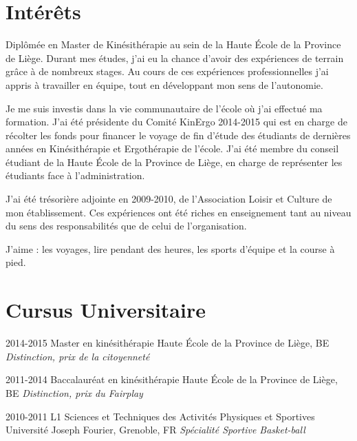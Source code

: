 \documentclass[]{cv-lea}
\begin{document}
\section{Intérêts}
Diplômée en Master de Kinésithérapie au sein de la Haute École de la Province de Liège.
Durant mes études, j’ai eu la chance d’avoir des expériences de terrain grâce à de nombreux
stages. Au cours de ces expériences professionnelles j’ai appris à travailler en équipe, tout en développant mon sens de l’autonomie.

Je me suis investis dans la vie communautaire de l'école où j'ai effectué ma formation. J'ai été présidente du Comité KinErgo 2014-2015 qui est en charge de récolter les fonds pour financer le voyage de fin d'étude des étudiants de dernières années en Kinésithérapie et Ergothérapie de l'école. J'ai été membre du conseil étudiant de la Haute École de la Province de Liège, en charge de représenter les étudiants face à l'administration.

J'ai été trésorière adjointe en 2009-2010, de l'Association Loisir et Culture de mon établissement.
Ces expériences ont été riches en enseignement tant au niveau du sens des responsabilités
que de celui de l'organisation.

J’aime : les voyages, lire pendant des heures, les sports d’équipe et la course à pied.

\section{Cursus Universitaire}

\begin{entrylist}
\entry
{2014-2015}
{Master en kinésithérapie}
{Haute École de la Province de Liège, BE}
{\emph{Distinction, prix de la citoyenneté}}
\end{entrylist}
\begin{entrylist}
\entry
{2011-2014}
{Baccalauréat en kinésithérapie}
{Haute École de la Province de Liège, BE}
{\emph{Distinction, prix du Fairplay}}
\end{entrylist}
\begin{entrylist}
\entry
{2010-2011}
{L1 Sciences et Techniques des Activités Physiques et Sportives}
{Université Joseph Fourier, Grenoble, FR}
{\emph{Spécialité Sportive Basket-ball}}
\end{entrylist}
\end{document}
